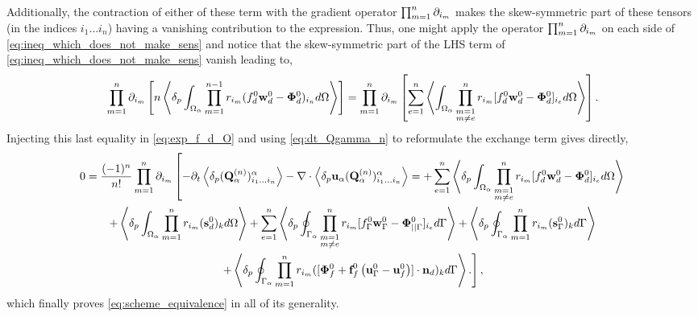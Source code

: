 \documentclass[11pt]{My_preprint}
\providecommand{\DIFaddbegin}{} %
\providecommand{\DIFaddend}{} %
\providecommand{\DIFdelbegin}{} %
\providecommand{\DIFdelend}{} %
\begin{document}
Additionally, the contraction of either of these term with the gradient operator $\prod_{m=1}^{n} \partial_{i_m}$ makes the skew-symmetric part of these tensors (in the indices $i_1\ldots i_n$) having a vanishing contribution to the expression.
Thus, one might apply the operator $\prod_{m=1}^{n} \partial_{i_m}$ on each side of \ref{eq:ineq_which_does_not_make_sens} and notice that the skew-symmetric part of the LHS term of \ref{eq:ineq_which_does_not_make_sens} vanish leading to, 
\begin{equation*}
    \partialp{1}{n}\left[
        n\pavg{\int_{\Omega_\alpha} \pri{1}{n-1} ( f_d^0 \textbf{w}_d^0-\bm\Phi_d^0)_{i_n} d\Omega}
        \right]
    =
    \partialp{1}{n}\left[
    \sum_{e=1}^{n} 
    \avg{
        \intO{
        \prod^{n}_{\substack{ m=1 \\m \neq e}} r_{i_m} [f_d^0 \textbf{w}_d^0  - \bm\Phi_d^0]_{i_e}
        }
    }
    \right]. 
    \label{eq:it_make_sens_again}
\end{equation*}
Injecting this last equality in \ref{eq:exp_f_d_O} and using \ref{eq:dt_Qgamma_n} to reformulate the exchange term gives directly, 
\begin{multline}
    0 = \frac{(-1)^n}{n!}
    \partialp{1}{n}
    \left[
        - \pddt \DIFdelbegin %
\DIFdelend \DIFaddbegin \pavg{(\textbf{Q}_\alpha^{(n)})_{i_1\ldots i_n}^\alpha}
        \DIFaddend - \div  \DIFdelbegin %
\DIFdelend \DIFaddbegin \pavg{\textbf{u}_\alpha (\textbf{Q}_\alpha^{(n)})_{i_1\ldots i_n}^\alpha}
        \DIFaddend =+\sum_{e=1}^{n} 
        \pOavg{
            \prod^{n}_{\substack{ m=1 \\m \neq e}} r_{i_m} [f_d^0\textbf{w}_d^0  - \bm\Phi_d^0]_{i_e}
        }\right.\\\left.
        + \pOavg{ \pri{1}{n} (\textbf{s}_d^0)_k }
        +     
        \sum_{e=1}^{n} 
        \pSavg{
            \prod^{n}_{\substack{ m=1 \\m \neq e}} r_{i_m} [f_\Gamma^0\textbf{w}_\Gamma^0 - \bm\Phi_{||\Gamma}^0]_{i_e}
        }
        + \pSavg{ \pri{1}{n} (\textbf{s}_\Gamma^0)_k } \right.\\\left.
        +\pSavg{ \pri{1}{n} ([\bm\Phi_f^0 + \textbf{f}_f^0 \left(\textbf{u}_\Gamma^0 - \textbf{u}_f^0\right)]\cdot \textbf{n}_d)_k }. 
    \right],
\end{multline}
which finally proves \ref{eq:scheme_equivalence} in all of its generality. 


\end{document}
